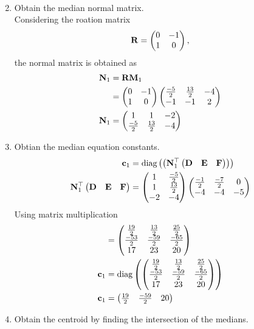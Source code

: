 \documentclass[11pt]{book}
\begin{document}
\begin{enumerate}[label=\thesubsection.\arabic*.,ref=\thesubsection.\theenumi]
\begin{align}
  \end{align}
\item Obtain the median normal matrix. \\
\solution Considering the roation matrix
\begin{align}
\mathbf{R}  = \begin{pmatrix}0 & -1 \\ 1 & 0\end{pmatrix},
\end{align}
the normal matrix is obtained as
\begin{align}
\mathbf{N}_1 &= \mathbf{R}\mathbf{M}_1  \\
&=\begin{pmatrix}0 & -1 \\ 1 & 0\end{pmatrix} \begin{pmatrix}\frac{-5}{2} & \frac{13}{2} & -4 \\ -1 & -1 & 2\end{pmatrix} \\
\mathbf{N}_1 &=  \begin{pmatrix} 1 & 1 & -2 \\ \frac{-5}{2} & \frac{13}{2} & -4 \end{pmatrix}
\end{align}
\item Obtian the median equation constants. \\
\begin{align}
\mathbf{c}_1 &= \text{diag}\left(\left(\mathbf{N}_1^{\top}\begin{pmatrix}\mathbf{D} & \mathbf{E} & \mathbf{F} \end{pmatrix}\right)\right)  \\
\mathbf{N}_1^{\top}\begin{pmatrix}\mathbf{D} & \mathbf{E} & \mathbf{F} \end{pmatrix} &= \begin{pmatrix}1&\frac{-5}{2} \\ 1&\frac{13}{2} \\ -2 &-4\end{pmatrix}\begin{pmatrix}\frac{-1}{2} & \frac{-7}{2} & 0 \\ -4 & -4 & -5\end{pmatrix} \\
\end{align}
Using matrix multiplication
\begin{align}
    &=\begin{pmatrix} \frac{19}{2} & \frac{13}{2} & \frac{25}{2} \\ \frac{-53}{2} & \frac{-59}{2} & \frac{-65}{2} \\ 17 & 23 & 20 \end{pmatrix} \\
    \mathbf{c}_1 &= \text{diag}\left( \begin{pmatrix} \frac{19}{2} & \frac{13}{2} & \frac{25}{2} \\ \frac{-53}{2} & \frac{-59}{2} & \frac{-65}{2} \\ 17 & 23 & 20 \end{pmatrix}\right) \\
    \mathbf{c}_1 &= \begin{pmatrix} \frac{19}{2} & \frac{-59}{2} & 20\end{pmatrix}
\end{align}
\item Obtain the centroid by finding the intersection of the medians.\\
\solution
 \begin{align}

\end{align}
\end{enumerate}
\end{document}
